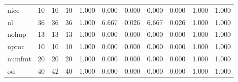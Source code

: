 \begin{longtable}{lp{1.2cm}p{1.2cm}p{1.2cm}p{1.2cm}p{1.2cm}p{1.2cm}p{1.2cm}p{1.2cm}p{1.2cm}p{1.2cm}}
nice      &                           10 &                 10 &                                10 &                                      1.000 &                                  0.000 &                                        0.000 &                             0.000 &                                   0.000 &                              1.000 &                                              1.000 \\
nl        &                           36 &                 36 &                                36 &                                      1.000 &                                  6.667 &                                        0.026 &                             6.667 &                                   0.026 &                              1.000 &                                              1.000 \\
nohup     &                           13 &                 13 &                                13 &                                      1.000 &                                  0.000 &                                        0.000 &                             0.000 &                                   0.000 &                              1.000 &                                              1.000 \\
nproc     &                           10 &                 10 &                                10 &                                      1.000 &                                  0.000 &                                        0.000 &                             0.000 &                                   0.000 &                              1.000 &                                              1.000 \\
numfmt    &                           20 &                 20 &                                20 &                                      1.000 &                                  0.000 &                                        0.000 &                             0.000 &                                   0.000 &                              1.000 &                                              1.000 \\
od        &                           40 &                 42 &                                40 &                                      1.000 &                                  0.000 &                                        0.000 &                             0.000 &                                   0.000 &                              1.000 &                                              1.000 \\

\end{longtable}
